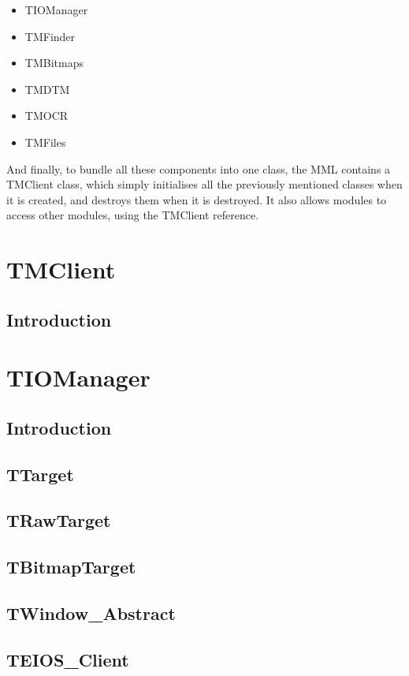\documentclass[a4paper, 10pt]{report} %
\begin{document}
\begin{itemize}
    \item   TIOManager
    \item   TMFinder
    \item   TMBitmaps
    \item   TMDTM
    \item   TMOCR
    \item   TMFiles
\end{itemize}

And finally, to bundle all these components into one class, the MML contains a
TMClient class, which simply initialises all the previously mentioned classes
when it is created, and destroys them when it is destroyed. It also allows
modules to access other modules, using the TMClient reference.

\section{TMClient}

\subsection{Introduction}


\section{TIOManager}


\subsection{Introduction}

\subsection{TTarget}
\subsection{TRawTarget}
\subsection{TBitmapTarget}
\subsection{TWindow\_Abstract}
\subsection{TEIOS\_Client}
\end{document}
